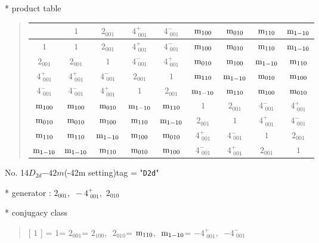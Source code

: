 \documentclass[fleqn,10pt,landscape]{jsarticle}
\begin{document}
* product table
\begin{quote}
\begin{tabular}{ccccccccc} \hline \hline
 & $ 1 $ & $ 2{}_{001} $ & $ 4^{+}_{\,\,001} $ & $ 4^{-}_{\,\,001} $ & $ {\rm m}_{100} $ & $ {\rm m}_{010} $ & $ {\rm m}_{110} $ & $ {\rm m}_{1-10} $ \\ \hline
$ 1 $ & $ 1 $ & $ 2{}_{001} $ & $ 4^{+}_{\,\,001} $ & $ 4^{-}_{\,\,001} $ & $ {\rm m}_{100} $ & $ {\rm m}_{010} $ & $ {\rm m}_{110} $ & $ {\rm m}_{1-10} $ \\
$ 2{}_{001} $ & $ 2{}_{001} $ & $ 1 $ & $ 4^{-}_{\,\,001} $ & $ 4^{+}_{\,\,001} $ & $ {\rm m}_{010} $ & $ {\rm m}_{100} $ & $ {\rm m}_{1-10} $ & $ {\rm m}_{110} $ \\
$ 4^{+}_{\,\,001} $ & $ 4^{+}_{\,\,001} $ & $ 4^{-}_{\,\,001} $ & $ 2{}_{001} $ & $ 1 $ & $ {\rm m}_{110} $ & $ {\rm m}_{1-10} $ & $ {\rm m}_{010} $ & $ {\rm m}_{100} $ \\
$ 4^{-}_{\,\,001} $ & $ 4^{-}_{\,\,001} $ & $ 4^{+}_{\,\,001} $ & $ 1 $ & $ 2{}_{001} $ & $ {\rm m}_{1-10} $ & $ {\rm m}_{110} $ & $ {\rm m}_{100} $ & $ {\rm m}_{010} $ \\
$ {\rm m}_{100} $ & $ {\rm m}_{100} $ & $ {\rm m}_{010} $ & $ {\rm m}_{1-10} $ & $ {\rm m}_{110} $ & $ 1 $ & $ 2{}_{001} $ & $ 4^{-}_{\,\,001} $ & $ 4^{+}_{\,\,001} $ \\
$ {\rm m}_{010} $ & $ {\rm m}_{010} $ & $ {\rm m}_{100} $ & $ {\rm m}_{110} $ & $ {\rm m}_{1-10} $ & $ 2{}_{001} $ & $ 1 $ & $ 4^{+}_{\,\,001} $ & $ 4^{-}_{\,\,001} $ \\
$ {\rm m}_{110} $ & $ {\rm m}_{110} $ & $ {\rm m}_{1-10} $ & $ {\rm m}_{100} $ & $ {\rm m}_{010} $ & $ 4^{+}_{\,\,001} $ & $ 4^{-}_{\,\,001} $ & $ 1 $ & $ 2{}_{001} $ \\
$ {\rm m}_{1-10} $ & $ {\rm m}_{1-10} $ & $ {\rm m}_{110} $ & $ {\rm m}_{010} $ & $ {\rm m}_{100} $ & $ 4^{-}_{\,\,001} $ & $ 4^{+}_{\,\,001} $ & $ 2{}_{001} $ & $ 1 $ \\
 \hline \hline
\end{tabular}
\end{quote}

\newpage

No. 14\quad$D_{2d}$\quad$-42m$\quad(-42m setting)\quad[ tetragonal ]
tag = "{\tt D2d}"

* generator : $2{}_{001},\,\,-4^{+}_{\,\,001},\,\,2{}_{010}$

* conjugacy class
\begin{quote}
[ $1$ ] = \quad $1$\newline[ $2{}_{001}$ ] = \quad $2{}_{001}$\newline[ $2{}_{100}$ ] = \quad $2{}_{100}$,\,\, $2{}_{010}$\newline[ ${\rm m}_{110}$ ] = \quad ${\rm m}_{110}$,\,\, ${\rm m}_{1-10}$\newline[ $-4^{+}_{\,\,001}$ ] = \quad $-4^{+}_{\,\,001}$,\,\, $-4^{-}_{\,\,001}$\newline
\end{quote}
\end{document}
